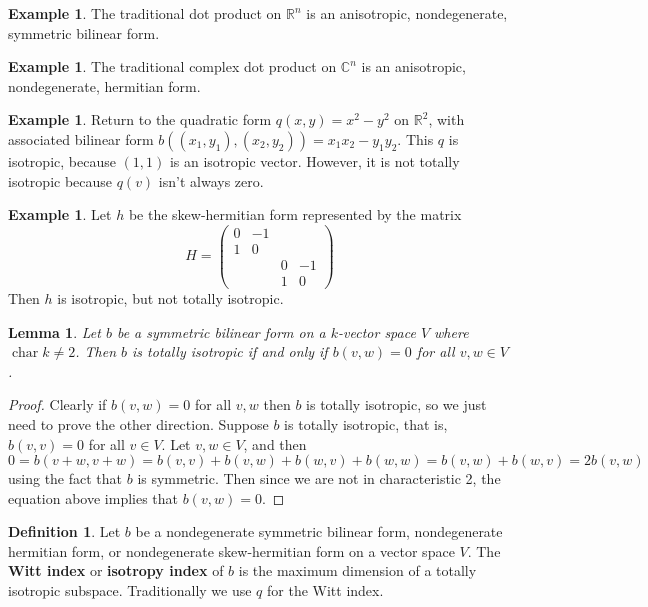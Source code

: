 \documentclass[12pt]{article}
\newtheorem{lemma}[theorem]{Lemma}
\theoremstyle{definition}
\newtheorem{definition}[theorem]{Definition}
\newtheorem{example}[theorem]{Example}
\newcommand{\R}{\mathbb{R}}
\newcommand{\C}{\mathbb{C}}
\newcommand{\tbf}{\textbf}
\DeclareMathOperator{\characteristic}{char}
\begin{document}
\begin{example}
The traditional dot product on $\R^n$ is an anisotropic, nondegenerate, symmetric bilinear form.
\end{example}

\begin{example}
The traditional complex dot product on $\C^n$ is an anisotropic, nondegenerate, hermitian form.
\end{example}

\begin{example}
Return to the quadratic form $q(x,y) = x^2 - y^2$ on $\R^2$, with associated bilinear form $b((x_1, y_1), (x_2, y_2)) = x_1 x_2 - y_1 y_2$. This $q$ is isotropic, because $(1,1)$ is an isotropic vector. However, it is not totally isotropic because $q(v)$ isn't always zero.
\end{example}

\begin{example}
Let $h$ be the skew-hermitian form represented by the matrix
\[
	H = 
	\begin{pmatrix}
		0 & -1 \\
		1 & 0 \\
		&& 0 & -1 \\
		&& 1 & 0
	\end{pmatrix}
\]
Then $h$ is isotropic, but not totally isotropic.
\end{example}

\begin{lemma}
Let $b$ be a symmetric bilinear form on a $k$-vector space $V$ where $\characteristic k \neq 2$. Then $b$ is totally isotropic if and only if $b(v,w) = 0$ for all $v, w \in V$.
\end{lemma}
\begin{proof}
Clearly if $b(v,w) = 0$ for all $v,w$ then $b$ is totally isotropic, so we just need to prove the other direction. Suppose $b$ is totally isotropic, that is, $b(v,v) =0$ for all $v \in V$. Let $v,w \in V$, and then
\[
	0 = b(v+w, v+w) = b(v,v) + b(v,w) + b(w,v) + b(w,w) = b(v,w) + b(w,v) = 2b(v,w)
\]
using the fact that $b$ is symmetric. Then since we are not in characteristic 2, the equation above implies that $b(v,w) = 0$.
\end{proof}

\begin{definition}
Let $b$ be a nondegenerate symmetric bilinear form, nondegenerate hermitian form, or nondegenerate skew-hermitian form on a vector space $V$. The \tbf{Witt index} or \tbf{isotropy index} of $b$ is the maximum dimension of a totally isotropic subspace. Traditionally we use $q$ for the Witt index.
\end{definition}
\end{document}
